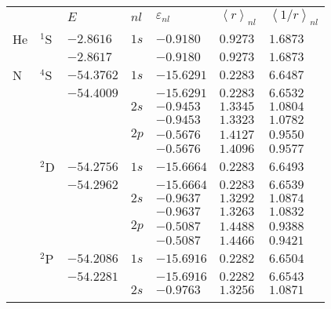 {{{{\begin{table}
\begin{center}
\begin{tabularx}{\textwidth}{
>{\centering\arraybackslash}p{}
>{\centering\arraybackslash}p{}
>{\centering\arraybackslash}p{}
>{\centering\arraybackslash}p{}
>{\centering\arraybackslash}p{}
>{\centering\arraybackslash}p{}
>{\centering\arraybackslash}p{}}
\rowcolor{mydarkgray} 
   & & $E$ & $nl$ & $\varepsilon_{nl}$ & $\left<r\right>_{nl}$ & $\left<1/r\right>_{nl}$ \\
He & $^1$S & $-2.8616$   & $1s$ & $-0.9180$  & $0.9273$ & $1.6873$ \\\rowcolor{mygray} 
   &       & $-2.8617$   &      & $-0.9180$  & $0.9273$ & $1.6873$ \\
N  & $^4$S & $-54.3762$  & $1s$ & $-15.6291$ & $0.2283$ & $6.6487$ \\\rowcolor{mygray} 
   &       & $-54.4009$  &      & $-15.6291$ & $0.2283$ & $6.6532$ \\
   &       &             & $2s$ & $-0.9453$  & $1.3345$ & $1.0804$ \\\rowcolor{mygray} 
   &       &             &      & $-0.9453$  & $1.3323$ & $1.0782$ \\
   &       &             & $2p$ & $-0.5676$  & $1.4127$ & $0.9550$ \\\rowcolor{mygray} 
   &       &             &      & $-0.5676$  & $1.4096$ & $0.9577$ \\
   & $^2$D & $-54.2756$  & $1s$ & $-15.6664$ & $0.2283$ & $6.6493$ \\\rowcolor{mygray} 
   &       & $-54.2962$  &      & $-15.6664$ & $0.2283$ & $6.6539$ \\
   &       &             & $2s$ & $-0.9637$  & $1.3292$ & $1.0874$ \\\rowcolor{mygray} 
   &       &             &      & $-0.9637$  & $1.3263$ & $1.0832$ \\
   &       &             & $2p$ & $-0.5087$  & $1.4488$ & $0.9388$ \\\rowcolor{mygray} 
   &       &             &      & $-0.5087$  & $1.4466$ & $0.9421$ \\
   & $^2$P & $-54.2086$  & $1s$ & $-15.6916$ & $0.2282$ & $6.6504$ \\\rowcolor{mygray} 
   &       & $-54.2281$  &      & $-15.6916$ & $0.2282$ & $6.6543$ \\
   &       &             & $2s$ & $-0.9763$  & $1.3256$ & $1.0871$ \\\rowcolor{mygray} 

\end{tabularx}
\end{center}
\end{table}}}}}
